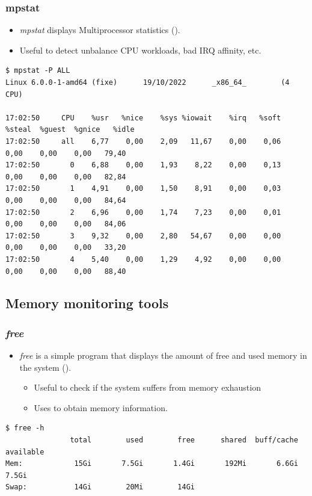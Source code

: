 \begin{frame}[fragile]
  \frametitle{mpstat}
  \begin{itemize}
    \item {\em mpstat} displays Multiprocessor statistics ().
    \item Useful to detect unbalance CPU workloads, bad IRQ affinity, etc.
  \end{itemize}
  \begin{block}{}
    \begin{verbatim}
$ mpstat -P ALL 
Linux 6.0.0-1-amd64 (fixe)      19/10/2022      _x86_64_        (4 CPU)

17:02:50     CPU    %usr   %nice    %sys %iowait    %irq   %soft  %steal  %guest  %gnice   %idle
17:02:50     all    6,77    0,00    2,09   11,67    0,00    0,06    0,00    0,00    0,00   79,40
17:02:50       0    6,88    0,00    1,93    8,22    0,00    0,13    0,00    0,00    0,00   82,84
17:02:50       1    4,91    0,00    1,50    8,91    0,00    0,03    0,00    0,00    0,00   84,64
17:02:50       2    6,96    0,00    1,74    7,23    0,00    0,01    0,00    0,00    0,00   84,06
17:02:50       3    9,32    0,00    2,80   54,67    0,00    0,00    0,00    0,00    0,00   33,20
17:02:50       4    5,40    0,00    1,29    4,92    0,00    0,00    0,00    0,00    0,00   88,40
    \end{verbatim}
  \end{block}
\end{frame}

\subsection{Memory monitoring tools}

\begin{frame}[fragile]
  \frametitle{{\em free}}
  \begin{itemize}
    \item {\em free} is a simple program that displays the amount of free and
          used memory in the system ().
    \begin{itemize}
      \item Useful to check if the system suffers from memory exhaustion
      \item Uses  to obtain memory information.
    \end{itemize}
  \end{itemize}
  \begin{block}{}
    \begin{verbatim}
$ free -h
               total        used        free      shared  buff/cache   available
Mem:            15Gi       7.5Gi       1.4Gi       192Mi       6.6Gi       7.5Gi
Swap:           14Gi        20Mi        14Gi
    \end{verbatim}
  \end{block}
\end{frame}


